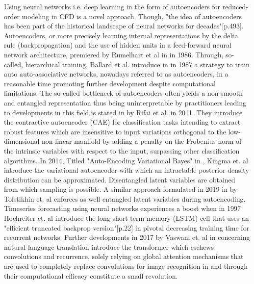 Using neural networks i.e. deep learning in the form of autoencoders for reduced-order modeling in CFD is a novel approach. Though, "the idea of autoencoders has been part of the historical landscape of neural networks for decades"\cite{Goodfellow}[p.493]. Autoencoders, or more precisely learning internal representations by the delta rule (backpropagation) and the use of hidden units in a feed-forward neural network architecture, premiered by Rumelhart et al in \cite{Rumelhart} in 1986. Through, so-called, hierarchical training, Ballard et al. introduce in  \cite{Ballard} in 1987 a strategy to train auto auto-associative networks, nowadays referred to as autoencoders, in a reasonable time promoting further development despite computational limitations. The so-called bottleneck of autoencoders often yields a non-smooth and entangled representation thus being uninterpretable by practitioners leading to developments in this field is stated in \cite{Rifai2011} by Rifai et al. in 2011. They introduce the contractive autoencoder (CAE) for classification tasks intending to extract robust features which are insensitive to input variations orthogonal to the low-dimensional non-linear manifold by adding a penalty on the Frobenius norm of the intrinsic variables with respect to the input, surpassing other classification algorithms. In 2014, Titled "Auto-Encoding Variational Bayes" in \cite{kingma2014autoencoding}, Kingma et. al introduce the variational autoencoder with which an intractable posterior density distribution can be approximated. Disentangled latent variables are obtained from which sampling is possible. A similar approach formulated in 2019 in \cite{tolstikhin2019wasserstein} by Tolstikhin et. al enforces as well entangled latent variables during autoencoding. Timeseries forecasting using neural networks experiences a boost when in 1997 Hochreiter et. al introduce the long short-term memory (LSTM) cell that uses an "efficient truncated backprop version"[p.22] in \cite{HochSchm97} pivotal decreasing training time for recurrent networks. Further developments in 2017 by Vaswani et. al in \cite{vaswani2017attention} concerning natural language translation introduce the transformer which eschews convolutions and recurrence, solely relying on global attention mechanisms that are used to completely replace convolutions for image recognition in \cite{dosovitskiy2021image} and through their computational efficacy constitute a small revolution.

